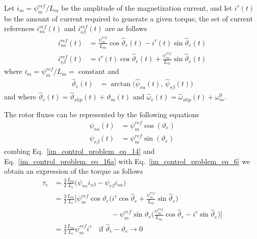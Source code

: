 \documentclass[12pt,a4paper,oneside]{book}
\begin{document}
\begin{onehalfspace}
Let $i_m = \psi_m^{ref}/L_m$ be the amplitude of the magnetization current, and let 
$i^{\tau}(t)$ be the amount of current required to generate a given torque, the 
set of current references $i_{s\alpha}^{ref}(t)$ and $i_{s\beta}^{ref}(t)$ are 
as follows
\begin{equation}\label{im_control_problem_eq_14}
	\begin{aligned}
		i_{s\alpha}^{ref}(t) &= 
		\frac{\psi_m^{ref}}{L_m}\cos\hat{\vartheta}_{e}(t)-i^{\tau}(t)\sin\hat{\vartheta}_{e}(t)
		\\[6pt]
		i_{s\beta}^{ref}(t) &= 
		i^{\tau}(t)\cos\hat{\vartheta}_{e}(t)+\frac{\psi_m^{ref}}{L_m}\sin\hat{\vartheta}_{e}(t)
	\end{aligned}
\end{equation}
where $i_m = \psi_m^{ref}/L_m=\text{ constant}$ and 
\begin{equation}\label{im_control_problem_eq_15}
	\begin{aligned}
		\hat{\vartheta}_{e}(t) &= 
		\arctan\Big(\hat{\psi}_{r\alpha}(t),\,\hat{\psi}_{r\beta}(t)\Big) 
	\end{aligned}
\end{equation}
and where 	$\hat{\vartheta}_{e}(t) = \hat{\vartheta}_{slip}(t)+\vartheta_{m}(t)$ 
and $\hat{\omega}_{e}(t) = \hat{\omega}_{slip}(t)+\omega_{m}^0$. 



The rotor fluxes can be represented by the following equations
\begin{equation}\label{im_control_problem_eq_16a}
	\begin{aligned}
		\psi_{r\alpha}(t) &= \psi_m^{ref}\cos(\vartheta_{e}) \\[6pt]
		\psi_{r\beta}(t) &= \psi_m^{ref}\sin(\vartheta_{e})
	\end{aligned}
\end{equation}
combing Eq.~\eqref{im_control_problem_eq_14} and Eq.~\eqref{im_control_problem_eq_16a} with Eq.~\eqref{im_control_problem_eq_6} we obtain an expression of the torque as follows
\begin{equation}\label{im_control_problem_eq_16b}
	\begin{aligned}
		\tau_e &= \frac{3}{2}\frac{L_m}{L_r}\Big(\psi_{r\alpha}i_{s\beta} - 	\psi_{r\beta}i_{s\alpha}\Big) \\[6pt]
		&=\frac{3}{2}\frac{L_m}{L_r}\Bigg[\psi_m^{ref}\cos\vartheta_{e}\Big(i^\tau\cos\hat{\vartheta}_{e}+\frac{\psi_m^{ref}}{L_m}\sin\hat{\vartheta}_{e}\Big) \\[6pt] &\qquad\qquad\qquad\qquad - \psi_m^{ref}\sin\vartheta_{e} \Big(\frac{\psi_m^{ref}}{L_m}\cos\hat{\vartheta}_{e}-i^\tau\sin\hat{\vartheta}_e\Big)\Bigg] \\[6pt]
		&= \frac{3}{2}\frac{L_m}{L_r}\psi_m^{ref}i^\tau \quad\text{if }\hat{\vartheta}_e-\vartheta_{e}\rightarrow0
	\end{aligned}
\end{equation}




\end{onehalfspace}
\end{document}
